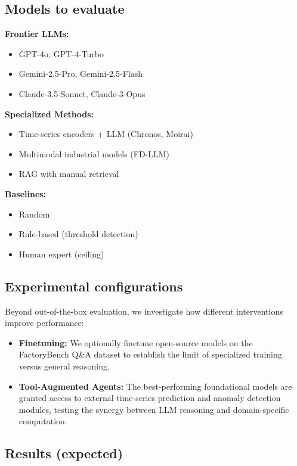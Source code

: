 \documentclass{article}
\begin{document}
\subsection{Models to evaluate}

\textbf{Frontier LLMs:}
\begin{itemize}
    \item GPT-4o, GPT-4-Turbo
    \item Gemini-2.5-Pro, Gemini-2.5-Flash
    \item Claude-3.5-Sonnet, Claude-3-Opus
\end{itemize}

\textbf{Specialized Methods:}
\begin{itemize}
    \item Time-series encoders + LLM (Chronos, Moirai)
    \item Multimodal industrial models (FD-LLM)
    \item RAG with manual retrieval
\end{itemize}

\textbf{Baselines:}
\begin{itemize}
    \item Random
    \item Rule-based (threshold detection)
    \item Human expert (ceiling)
\end{itemize}

\subsection{Experimental configurations}

Beyond out-of-the-box evaluation, we investigate how different interventions improve performance:

\begin{itemize}
    \item \textbf{Finetuning:} We optionally finetune open-source models on the FactoryBench Q\&A dataset to establish the limit of specialized training versus general reasoning.
    \item \textbf{Tool-Augmented Agents:} The best-performing foundational models are granted access to external time-series prediction and anomaly detection modules, testing the synergy between LLM reasoning and domain-specific computation.
\end{itemize}

\subsection{Results (expected)}
\end{document}
